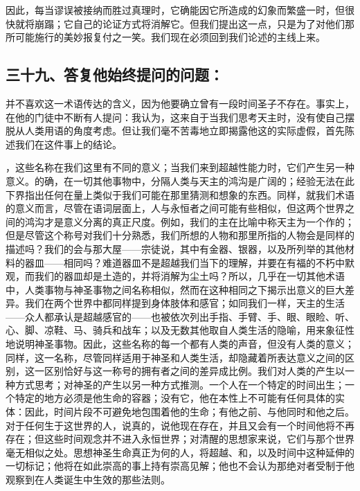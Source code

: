 因此，每当谬误被接纳而胜过真理时，它确能因它所造成的幻象而繁盛一时，但很快就将崩蹋；它自己的论证方式将消解它。但我们提出这一点，只是为了对他们那所可能施行的美妙报复付之一笑。我们现在必须回到我们论述的主线上来。\par


\subsection{三十九、答复他始终提问的问题：}

并不喜欢这一术语传达的含义，因为他要确立曾有一段时间圣子不存在。事实上，在他的门徒中不断有人提问：我认为，这来自于当我们思考天主时，没有使自己摆脱从人类用语的角度考虑。但让我们毫不苦毒地立即揭露他这的实际虚假，首先陈述我们在这件事上的结论。\par

，这些名称在我们这里有不同的意义；当我们来到超越性能力时，它们产生另一种意义。的确，在一切其他事物中，分隔人类与天主的鸿沟是广阔的；经验无法在此下界指出任何在量上类似于我们可能在那里猜测和想象的东西。同样，就我们术语的意义而言，尽管在语词层面上，人与永恒者之间可能有些相似，但这两个世界之间的鸿沟才是意义分离的真正尺度。例如，我们的主在比喻中称天主为一个作的；但是尽管这个称号对我们十分熟悉，我们所想的人物和那里所指的人物会是同样的描述吗？我们的会与那大屋——宗徒说，其中有金器、银器，以及所列举的其他材料的器皿——相同吗？难道器皿不是超越我们当下的理解，并要在有福的不朽中默观，而我们的器皿却是土造的，并将消解为尘土吗？所以，几乎在一切其他术语中，人类事物与神圣事物之间名称相似，然而在这种相同之下揭示出意义的巨大差异。我们在两个世界中都同样提到身体肢体和感官；如同我们一样，天主的生活——众人都承认是超越感官的——也被依次列出手指、手臂、手、眼、眼睑、听、心、脚、凉鞋、马、骑兵和战车；以及无数其他取自人类生活的隐喻，用来象征性地说明神圣事物。因此，这些名称的每一个都有人类的声音，但没有人类的意义；同样，这一名称，尽管同样适用于神圣和人类生活，却隐藏着所表达意义之间的区别，这一区别恰好与这一称号的拥有者之间的差异成比例。我们对人类的产生以一种方式思考；对神圣的产生以另一种方式推测。一个人在一个特定的时间出生；一个特定的地方必须是他生命的容器；没有它，他在本性上不可能有任何具体的实体：因此，时间片段不可避免地包围着他的生命；有他之前、与他同时和他之后。对于任何生于这世界的人，说真的，说他现在存在，并且又会有一个时间他将不再存在；但这些时间观念并不进入永恒世界；对清醒的思想家来说，它们与那个世界毫无相似之处。思想神圣生命真正为何的人，将超越、和，以及时间中这种延伸的一切标记；他将在如此崇高的事上持有崇高见解；他也不会认为那绝对者受制于他观察到在人类诞生中生效的那些法则。\par

